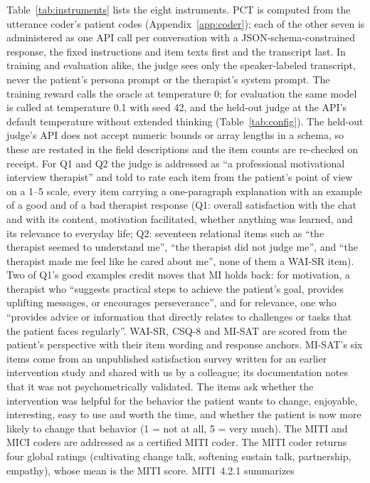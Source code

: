 Table~\ref{tab:instruments} lists the eight instruments. PCT is computed from the utterance
coder's patient codes (Appendix~\ref{app:coder}); each of the other seven is administered as one
API call per conversation with a JSON-schema-constrained response, the fixed instructions and item
texts first and the transcript last. In training and evaluation alike, the judge sees only the
speaker-labeled transcript, never the patient's persona prompt or the therapist's system prompt.
The training reward calls the oracle at temperature 0; for evaluation the
same model is called at temperature 0.1 with seed 42, and the held-out judge at the API's default
temperature without extended thinking (Table~\ref{tab:config}). The held-out judge's API does not
accept numeric bounds or array lengths in a schema, so these are restated in the field
descriptions and the item counts are re-checked on receipt. For Q1 and Q2 the judge is addressed as ``a professional motivational
interview therapist'' and told to rate each item from the patient's point of view on a 1--5 scale,
every item carrying a one-paragraph explanation with an example of a good and of a bad therapist
response (Q1: overall satisfaction with the chat and with its content, motivation facilitated,
whether anything was learned, and its relevance to everyday life; Q2: seventeen relational items
such as ``the therapist seemed to understand me'', ``the therapist did not judge me'', and ``the
therapist made me feel like he cared about me'', none of them a WAI-SR item). Two of Q1's good examples credit moves that MI
holds back: for motivation, a therapist who ``suggests practical steps to achieve the patient's
goal, provides uplifting messages, or encourages perseverance'', and for relevance, one who
``provides advice or information that directly relates to challenges or tasks that the patient
faces regularly''. WAI-SR, CSQ-8 and MI-SAT are scored from the
patient's perspective with their item wording and response anchors. MI-SAT's six items come from an
unpublished satisfaction survey written for an earlier intervention study and shared with us by a
colleague; its documentation notes that it was not psychometrically validated. The items ask whether the intervention was helpful for the
behavior the patient wants to change, enjoyable, interesting, easy to use and worth the time, and
whether the patient is now more likely to change that behavior (1 = not at all, 5 = very much). The MITI and MICI coders
are addressed as a certified MITI coder. The MITI coder returns four global ratings (cultivating change talk,
softening sustain talk, partnership, empathy), whose mean is the MITI score. MITI~4.2.1 summarizes
